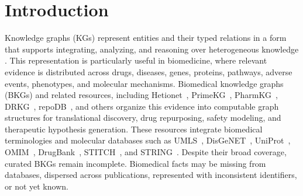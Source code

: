 \documentclass[pdflatex,sn-mathphys-num]{sn-jnl}
\begin{document}

\maketitle


\section{Introduction}
\label{sec:introduction}

Knowledge graphs (KGs) represent entities and their typed relations in a form that supports integrating, analyzing, and reasoning over heterogeneous knowledge \citep{nickel2015review,ji2021survey,hogan2021knowledge}. This representation is particularly useful in biomedicine, where relevant evidence is distributed across drugs, diseases, genes, proteins, pathways, adverse events, phenotypes, and molecular mechanisms. Biomedical knowledge graphs (BKGs) and related resources, including Hetionet~\citep{himmelstein2017systematic}, PrimeKG~\citep{chandak2023building}, PharmKG~\citep{zheng2021pharmkg}, DRKG~\citep{drkg2020}, repoDB~\citep{brown2017standard}, and others organize this evidence into computable graph structures for translational discovery, drug repurposing, safety modeling, and therapeutic hypothesis generation. These resources integrate biomedical terminologies and molecular databases such as UMLS~\citep{bodenreider2004unified}, DisGeNET~\citep{pinero2020disgenet}, UniProt~\citep{uniprot2018uniprot}, OMIM~\citep{amberger2019omim}, DrugBank~\citep{wishart2018drugbank}, STITCH~\citep{kuhn2014stitch}, and STRING~\citep{szklarczyk2021string}. Despite their broad coverage, curated BKGs remain incomplete. Biomedical facts may be missing from databases, dispersed across publications, represented with inconsistent identifiers, or not yet known.
\end{document}
